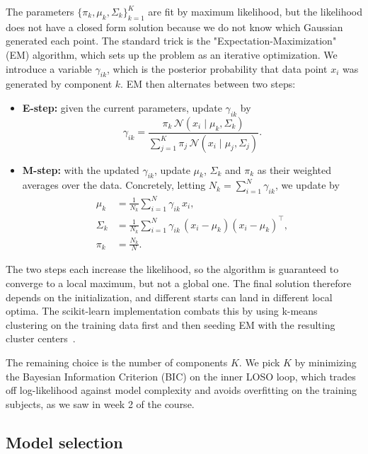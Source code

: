 \documentclass{article}
\begin{document}
The parameters $\{\pi_k, \mu_k, \Sigma_k\}_{k=1}^{K}$ are fit by maximum likelihood, but the likelihood does not have a closed form solution because we do not know which Gaussian generated each point. The standard trick is the "Expectation-Maximization" (EM) algorithm, which sets up the problem as an iterative optimization. We introduce a variable $\gamma_{ik}$, which is the posterior probability that data point $x_i$ was generated by component $k$. EM then alternates between two steps:
\begin{itemize}
    \item \textbf{E-step:} given the current parameters, update $\gamma_{ik}$ by
    \begin{equation}
        \gamma_{ik} = \frac{\pi_k \, \mathcal{N}(x_i \mid \mu_k, \Sigma_k)}{\sum_{j=1}^{K} \pi_j \, \mathcal{N}(x_i \mid \mu_j, \Sigma_j)}.
    \end{equation}
    \item \textbf{M-step:} with the updated $\gamma_{ik}$, update $\mu_k$, $\Sigma_k$ and $\pi_k$ as their weighted averages over the data. Concretely, letting $N_k = \sum_{i=1}^{N} \gamma_{ik}$, we update by
    \begin{align}
        \mu_k    &= \frac{1}{N_k} \sum_{i=1}^{N} \gamma_{ik}\, x_i, \\
        \Sigma_k &= \frac{1}{N_k} \sum_{i=1}^{N} \gamma_{ik}\, (x_i - \mu_k)(x_i - \mu_k)^\top, \\
        \pi_k    &= \frac{N_k}{N}.
    \end{align}
\end{itemize}
The two steps each increase the likelihood, so the algorithm is guaranteed to converge to a local maximum, but not a global one. The final solution therefore depends on the initialization, and different starts can land in different local optima. The scikit-learn implementation combats this by using k-means clustering on the training data first and then seeding EM with the resulting cluster centers~\cite{sklearn-gmm}.

The remaining choice is the number of components $K$. We pick $K$ by minimizing the Bayesian Information Criterion (BIC) on the inner LOSO loop, which trades off log-likelihood against model complexity and avoids overfitting on the training subjects, as we saw in week 2 of the course.

\subsection*{Model selection}
\end{document}
